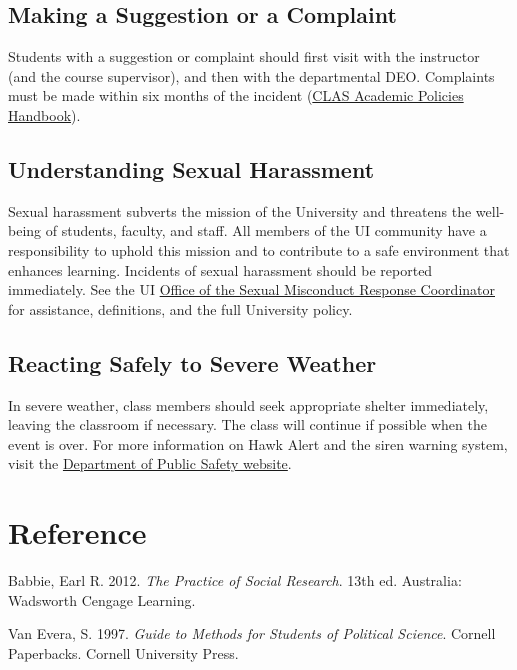 \documentclass[11pt,]{article}
\theoremstyle{definition}
\theoremstyle{definition}
\theoremstyle{remark}
\begin{document}
\subsection{Making a Suggestion or a
Complaint}\label{making-a-suggestion-or-a-complaint}

Students with a suggestion or complaint should first visit with the
instructor (and the course supervisor), and then with the departmental
DEO. Complaints must be made within six months of the incident
(\href{https://clas.uiowa.edu/students/handbook}{CLAS Academic Policies
Handbook}).

\subsection{Understanding Sexual
Harassment}\label{understanding-sexual-harassment}

Sexual harassment subverts the mission of the University and threatens
the well-being of students, faculty, and staff. All members of the UI
community have a responsibility to uphold this mission and to contribute
to a safe environment that enhances learning. Incidents of sexual
harassment should be reported immediately. See the UI
\href{https://osmrc.uiowa.edu/}{Office of the Sexual Misconduct Response
Coordinator} for assistance, definitions, and the full University
policy.

\subsection{Reacting Safely to Severe
Weather}\label{reacting-safely-to-severe-weather}

In severe weather, class members should seek appropriate shelter
immediately, leaving the classroom if necessary. The class will continue
if possible when the event is over. For more information on Hawk Alert
and the siren warning system, visit the
\href{https://police.uiowa.edu/emergency-communications}{Department of
Public Safety website}.

\clearpage

\section*{Reference}\label{reference}

\hypertarget{refs}{}
\hypertarget{ref-Babbie2012}{}
Babbie, Earl R. 2012. \emph{The Practice of Social Research}. 13th ed.
Australia: Wadsworth Cengage Learning.

\hypertarget{ref-VanEvera1997}{}
Van Evera, S. 1997. \emph{Guide to Methods for Students of Political
Science}. Cornell Paperbacks. Cornell University Press.



\clearpage
\end{document}
